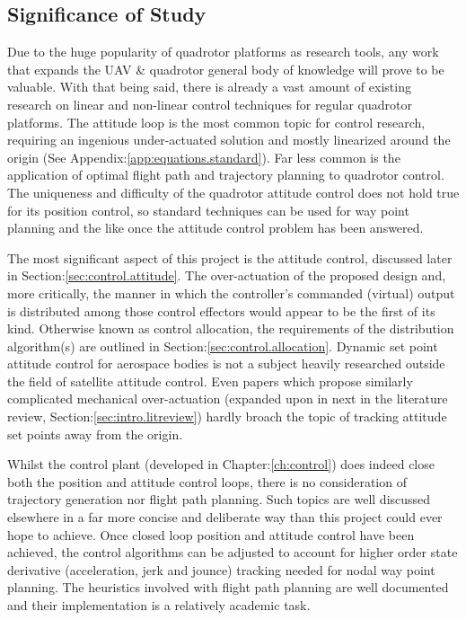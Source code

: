 \subsection{Significance of Study}
\label{subsec:intro.foreword.significance}
Due to the huge popularity of quadrotor platforms as research tools, any work that expands the UAV \& quadrotor general body of knowledge will prove to be valuable. With that being said, there is already a vast amount of existing research on linear and non-linear control techniques for regular quadrotor platforms. The attitude loop is the most common topic for control research, requiring an ingenious under-actuated solution and mostly linearized around the origin (See Appendix:\ref{app:equations.standard}). Far less common is the application of optimal flight path and trajectory planning to quadrotor control. The uniqueness and difficulty of the quadrotor attitude control does not hold true for its position control, so standard techniques can be used for way point planning and the like once the attitude control problem has been answered.
\par
The most significant aspect of this project is the attitude control, discussed later in Section:\ref{sec:control.attitude}. The over-actuation of the proposed design and, more critically, the manner in which the controller's commanded (virtual) output is distributed among those control effectors would appear to be the first of its kind. Otherwise known as control allocation, the requirements of the distribution algorithm(s) are outlined in Section:\ref{sec:control.allocation}. Dynamic set point attitude control for aerospace bodies is not a subject heavily researched outside the field of satellite attitude control. Even papers which propose similarly complicated mechanical over-actuation (expanded upon in next in the literature review, Section:\ref{sec:intro.litreview}) hardly broach the topic of tracking attitude set points away from the origin.
\par
Whilst the control plant (developed in Chapter:\ref{ch:control}) does indeed close both the position and attitude control loops, there is no consideration of trajectory generation nor flight path planning. Such topics are well discussed elsewhere in a far more concise and deliberate way than this project could ever hope to achieve. Once closed loop position and attitude control have been achieved, the control algorithms can be adjusted to account for higher order state derivative (acceleration, jerk and jounce) tracking needed for nodal way point planning. The heuristics involved with flight path planning are well documented and their implementation is a relatively academic task.

